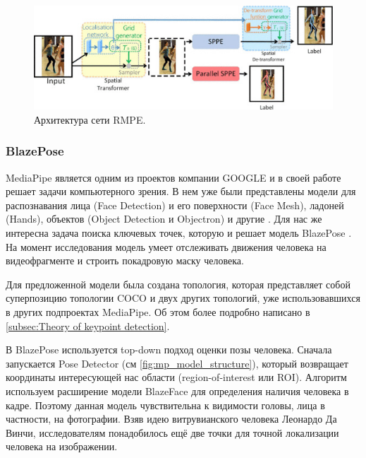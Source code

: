 \begin{figure}[h]
	\centering
	\includegraphics[width=\textwidth]{./images/AlphaPose_architecture}
	\caption{Архитектура сети RMPE. \cite{fang2017rmpe}}
	\label{fig:ap_architecture}
\end{figure}



\subsubsection{BlazePose}
\label{subsubsec:blazepose_desc}

MediaPipe является одним из проектов компании GOOGLE и в своей работе решает задачи компьютерного зрения. В нем уже были представлены модели для распознавания лица (Face Detection) и его поверхности (Face Mesh), ладоней (Hands), объектов (Object Detection и Objectron) и другие \cite{mediapipe}. Для нас же интересна задача поиска ключевых точек, которую и решает модель BlazePose \cite{BlazePose}. На момент исследования модель умеет отслеживать движения человека на видеофрагменте и строить покадровую маску человека.

Для предложенной модели была создана топология, которая представляет собой суперпозицию топологии COCO и двух других топологий, уже использовавшихся в других подпроектах MediaPipe. Об этом более подробно написано в \autoref{subsec:Theory of keypoint detection}.

В BlazePose используется top-down подход оценки позы человека. Сначала запускается Pose Detector (см \autoref{fig:mp_model_structure}), который возвращает координаты интересующей нас области (region-of-interest или ROI). Алгоритм используем расширение модели BlazeFace для определения наличия человека в кадре. Поэтому данная модель чувствительна к видимости головы, лица в частности, на фотографии. Взяв идею витрувианского человека Леонардо Да Винчи, исследователям понадобилось ещё две точки для точной локализации человека на изображении.

